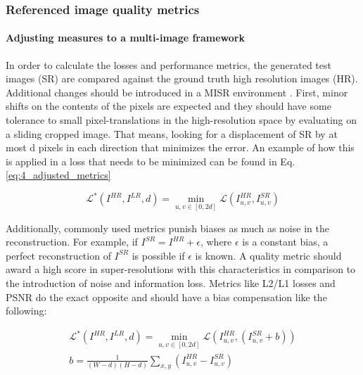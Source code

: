         \subsubsection{Referenced image quality metrics}

        
        
    
            \paragraph{Adjusting measures to a multi-image framework}
    
            In order to calculate the losses and performance metrics, the generated test images (SR) are compared against the ground truth high resolution images (HR). Additional changes should be introduced in a MISR environment \cite{martens2019superresolution}. First, minor shifts on the contents of the pixels are expected and they should have some tolerance to small pixel-translations in the high-resolution space by evaluating on a sliding cropped image. That means, looking for a displacement of SR by at most d pixels in each direction that minimizes the error. An example of how this is applied in a loss that needs to be minimized can be found in Eq. \ref{eq:4_adjusted_metrics}
    
            \begin{equation}
               \mathcal{L}^* ( I^{HR}, I^{LR}, d) = \min_{u,v \in [0,2d]} \mathcal{L} ( I^{HR}_{u,v}, I^{SR}_{u,v})
            \label{eq:4_adjusted_metrics}
            \end{equation}
    
            Additionally, commonly used metrics punish biases as much as noise in the reconstruction. For example, if $I^{SR} = I^{HR} + \epsilon$, where $\epsilon$ is a constant bias, a perfect reconstruction of $I^{SR}$ is possible if $\epsilon$ is known. A quality metric should award  a high score in super-resolutions with this characteristics in comparison to the introduction of noise and information loss. Metrics like L2/L1 losses and PSNR do the exact opposite and should have a bias compensation like the following: 
    
            \begin{equation}
                \begin{aligned}
                    \mathcal{L}^* ( I^{HR}, I^{LR}, d) = \min_{u,v \in [0,2d]} \mathcal{L} ( I^{HR}_{u,v}, (I^{SR}_{u,v}+b)) \\
                    b = \frac{1}{(W - d)(H - d)} \sum_{x,y} \left( I^{HR}_{u,v} - I^{SR}_{u,v} \right)
               \end{aligned}
            \end{equation}
    
